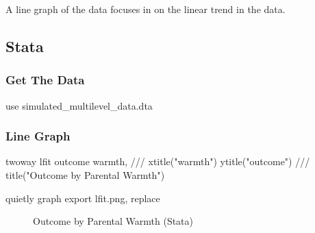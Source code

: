 \documentclass[
  letterpaper,
  DIV=11,
  numbers=noendperiod]{scrreprt}
\newenvironment{Shaded}{\begin{snugshade}}{\end{snugshade}}
\newcommand{\BaseNTok}[1]{\textcolor[rgb]{0.68,0.00,0.00}{#1}}
\newcommand{\CommentTok}[1]{\textcolor[rgb]{0.37,0.37,0.37}{#1}}
\newcommand{\KeywordTok}[1]{\textcolor[rgb]{0.00,0.23,0.31}{#1}}
\newcommand{\NormalTok}[1]{\textcolor[rgb]{0.00,0.23,0.31}{#1}}
\newcommand{\StringTok}[1]{\textcolor[rgb]{0.13,0.47,0.30}{#1}}
\begin{document}
A line graph of the data focuses in on the linear trend in the data.

\subsection{Stata}

\subsubsection{Get The Data}\label{get-the-data-3}

\begin{Shaded}
\begin{Highlighting}[]

\KeywordTok{use}\NormalTok{ simulated\_multilevel\_data.dta}
\end{Highlighting}
\end{Shaded}

\subsubsection{Line Graph}\label{line-graph}

\begin{Shaded}
\begin{Highlighting}[]
\KeywordTok{twoway} \KeywordTok{lfit}\NormalTok{ outcome warmth, }\CommentTok{///}
  \BaseNTok{xtitle}\NormalTok{(}\StringTok{"warmth"}\NormalTok{) }\BaseNTok{ytitle}\NormalTok{(}\StringTok{"outcome"}\NormalTok{) }\CommentTok{///}
  \BaseNTok{title}\NormalTok{(}\StringTok{"Outcome by Parental Warmth"}\NormalTok{) }

\KeywordTok{quietly} \KeywordTok{graph} \KeywordTok{export} \KeywordTok{lfit}\NormalTok{.png, }\KeywordTok{replace}
\end{Highlighting}
\end{Shaded}

\begin{figure}


\caption{\label{fig-Statalfit}Outcome by Parental Warmth (Stata)}

\end{figure}%
\end{document}
